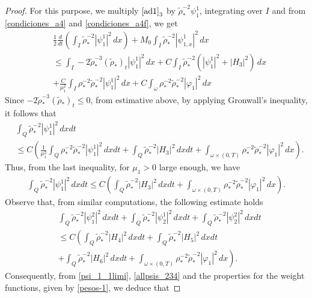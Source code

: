 \documentclass[11pt,a4paper]{amsart}
\numberwithin{equation}{section}
\begin{document}
\begin{proof}
 \noindent For this purpose, we multiply $\eqref{ad1}_{3}$ by $\tilde{\rho}^{-2}_{*}\psi^{1}_{1}$, integrating  over  $I$ and from \eqref{condiciones_a4} and \eqref{condiciones_a4f}, we get
 \begin{align*}
&\frac{1}{2}\frac{d}{dt}\left( \int_{I}\tilde{\rho}^{-2}_{*}|\psi^{1}_{1}|^{2}\,dx \right)+M_{0}\int_{I}\tilde{\rho}^{-2}_{*}|\psi^{1}_{1,x}|^{2}\,dx\\
& \leq \int_{I}-2\tilde{\rho}^{-3}_{*}(\tilde{\rho}_{*})_{t}|\psi^{1}_{1}|^{2}\,dx+C\int_{I} \tilde{\rho}^{-2}_{*}(|\psi^{1}_{1}|^{2}+|H_{3}|^{2})\,dx\\
&+\frac{C}{\mu^{2}_{1}}\int_{I}\rho^{-2}_{*}\tilde{\rho}^{-2}_{*}|\psi^{1}_1|^{2}\,dx + C\int_{\omega}\rho^{-2}_{*}\tilde{\rho}^{-2}_{*}|\varphi_1|^{2}\,dx 
 \end{align*}Since    $-2\tilde{\rho}^{-3}_{*}(\tilde{\rho}_{*})_{t}\leq 0$, from estimative above,   by applying Gronwall's inequality, it follows that
 \begin{align*}
&\int_{Q}\tilde{\rho}^{-2}_{*}|\psi^{1}_{1}|^{2}\,dxdt \\
&\leq C\left(\frac{1}{\mu^{2}_{1}}\int_{Q}\rho^{-2}_{*}\tilde{\rho}^{-2}_{*}|\psi^{1}_{1}|^{2}\,dxdt+\int_{Q}\tilde{\rho}^{-2}_{*}|H_{3}|^{2}\,dxdt +\int_{\omega\times (0,T)}\rho^{-2}_{*}\tilde{\rho}^{-2}_{*}|\varphi_1|^{2}\,dx\right).
 \end{align*}Thus, from the last inequality,  for $\mu_1>0$ large enough, we have
 \begin{align}\label{psi_1_1limi}
\int_{Q}\tilde{\rho}^{-2}_{*}|\psi^{1}_{1}|^{2}\,dxdt \leq C\left(\int_{Q}\tilde{\rho}^{-2}_{*}|H_{3}|^{2}\,dxdt +\int_{\omega\times (0,T)}\rho^{-2}_{*}\tilde{\rho}^{-2}_{*}|\varphi_1|^{2}\,dx\right).
 \end{align}Observe that, from similar computations, the following estimate holds
 \begin{equation}\label{allpsis_234}
\begin{split}
&\int_{Q}\tilde{\rho}^{-2}_{*}|\psi^{2}_{1}|^{2}\,dxdt + \int_{Q}\tilde{\rho}^{-2}_{*}|\psi^{1}_{2}|^{2}\,dxdt + \int_{Q}\tilde{\rho}^{-2}_{*}|\psi^{2}_{2}|^{2}\,dxdt  \\
& \leq C\left(\int_{Q}\tilde{\rho}^{-2}_{*}|H_{4}|^{2}\,dxdt +\int_{Q}\tilde{\rho}^{-2}_{*}|H_{5}|^{2}\,dxdt \right.\\
&\left.+\int_{Q}\tilde{\rho}^{-2}_{*}|H_{6}|^{2}\,dxdt +\int_{\omega\times (0,T)}\rho^{-2}_{*}\tilde{\rho}^{-2}_{*}|\varphi_1|^{2}\,dx\right).
\end{split}
 \end{equation}Consequently, from \eqref{psi_1_1limi}, \eqref{allpsis_234} and the properties for the weight functions, given by \eqref{pesos-1}, we deduce that

\end{proof}
\end{document}
